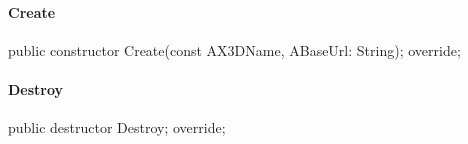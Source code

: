 \documentclass{report}
\newif\ifpdf
\begin{document}
\paragraph*{Create}\hspace*{\fill}

\label{ok_nested_with_exclude.TSkinNode-Create}
\begin{list}{}{
\setlength{\itemindent}{0cm}
\setlength{\listparindent}{0cm}
\setlength{\leftmargin}{\evensidemargin}
\addtolength{\leftmargin}{\tmplength}
\settowidth{\labelsep}{X}
\addtolength{\leftmargin}{\labelsep}
\setlength{\labelwidth}{\tmplength}
}
\item[\textbf{Declaration}\hfill]
\ifpdf
\begin{flushleft}
\fi
\begin{ttfamily}
public constructor Create(const AX3DName, ABaseUrl: String); override;\end{ttfamily}

\ifpdf
\end{flushleft}
\fi

\end{list}
\paragraph*{Destroy}\hspace*{\fill}

\label{ok_nested_with_exclude.TSkinNode-Destroy}
\begin{list}{}{
\setlength{\itemindent}{0cm}
\setlength{\listparindent}{0cm}
\setlength{\leftmargin}{\evensidemargin}
\addtolength{\leftmargin}{\tmplength}
\settowidth{\labelsep}{X}
\addtolength{\leftmargin}{\labelsep}
\setlength{\labelwidth}{\tmplength}
}
\item[\textbf{Declaration}\hfill]
\ifpdf
\begin{flushleft}
\fi
\begin{ttfamily}
public destructor Destroy; override;\end{ttfamily}

\ifpdf
\end{flushleft}
\fi

\end{list}
\end{document}
